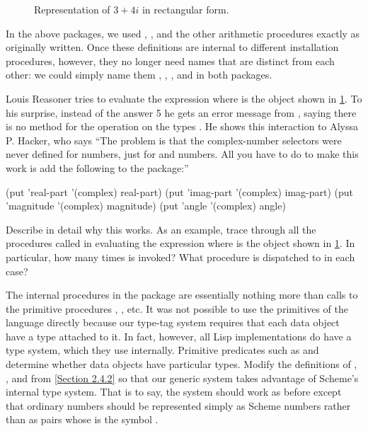 \begin{figure}[tb]
	\centering
	
	\caption{Representation of \( 3 + 4i \) in rectangular form.}
	\label{Figure 2.24}
\end{figure}

In the above packages, we used , , and the other arithmetic procedures exactly as originally written.
Once these definitions are internal to different installation procedures, however, they no longer need names that are distinct from each other:
we could simply name them , , , and  in both packages.



\begin{exercise}
	\label{Exercise 2.77}
	Louis Reasoner tries to evaluate the expression  where  is the object shown in \cref{Figure 2.24}.
	To his surprise, instead of the answer 5 he gets an error message from , saying there is no method for the operation  on the types .
	He shows this interaction to Alyssa P.
	Hacker, who says “The problem is that the complex-number selectors were never defined for  numbers, just for  and  numbers.
	All you have to do to make this work is add the following to the  package:”
	\begin{scheme}
	  (put 'real-part '(complex) real-part)
	  (put 'imag-part '(complex) imag-part)
	  (put 'magnitude '(complex) magnitude)
	  (put 'angle '(complex) angle)
	\end{scheme}
	Describe in detail why this works.
	As an example, trace through all the procedures called in evaluating the expression  where  is the object shown in \cref{Figure 2.24}.
	In particular, how many times is  invoked?
	What procedure is dispatched to in each case?
\end{exercise}



\begin{exercise}
	\label{Exercise 2.78}
	The internal procedures in the  package are essentially nothing more than calls to the primitive procedures \code{+}, \code{-}, etc.
	It was not possible to use the primitives of the language directly because our type-tag system requires that each data object have a type attached to it.
	In fact, however, all Lisp implementations do have a type system, which they use internally.
	Primitive predicates such as  and  determine whether data objects have particular types.
	Modify the definitions of , , and  from \cref{Section 2.4.2} so that our generic system takes advantage of Scheme’s internal type system.
	That is to say, the system should work as before except that ordinary numbers should be represented simply as Scheme numbers rather than as pairs whose  is the symbol .
\end{exercise}



